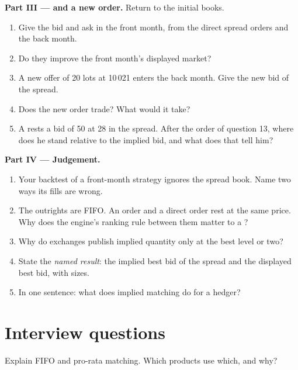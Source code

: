 \begin{problem}
\medskip\noindent\textbf{Part III ---  and a new order.}
Return to the initial books.
\begin{enumerate}[resume]
\item Give the  bid and ask in the front month, from the direct
spread orders and the back month.
\item Do they improve the front month's displayed market?
\item A new offer of 20 lots at 10\,021 enters the back month. Give the new
 bid of the spread.
\item Does the new order trade? What would it take?
\item A  rests a bid of 50 at 28 in the spread. After the order
of question 13, where does he stand relative to the implied bid, and what
does that tell him?
\end{enumerate}

\medskip\noindent\textbf{Part IV --- Judgement.}
\begin{enumerate}[resume]
\item Your backtest of a front-month strategy ignores the spread book. Name
two ways its fills are wrong.
\item The outrights are FIFO. An  order and a direct order rest at
the same price. Why does the engine's ranking rule between them matter to a
?
\item Why do exchanges publish implied quantity only at the best level or
two?
\item State the \emph{named result}: the implied best bid of the spread and
the displayed best bid, with sizes.
\item In one sentence: what does implied matching do for a hedger?
\end{enumerate}
\end{problem}

\section{Interview questions}

\begin{interviewq}\label{iq:m1:matching-algorithms-and-implied-spreads:1}
Explain FIFO and pro-rata matching. Which products use which, and why?
\end{interviewq}

